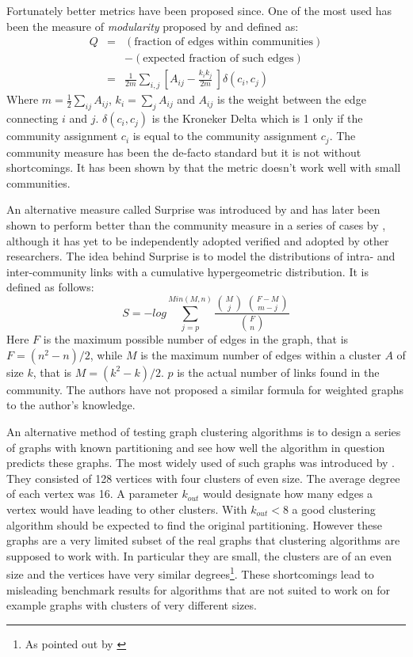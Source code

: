 Fortunately better metrics have been proposed since. One of the most 
used has been the measure of \emph{modularity} proposed by 
\cite{girvan2002} and defined as:
\begin{eqnarray}
	Q & = & (\mbox{fraction of edges within communities}) \\
	  & & - (\mbox{expected fraction of such edges}) \\
	& = & \frac{1}{2m} \sum_{i,j} \left[ A_{ij} - \frac{k_i k_j}{2m} \
\right] \delta(c_i, c_j)
\end{eqnarray}
Where $m=\frac{1}{2} \sum_{ij} A_{ij}$, $k_i = \sum_j A_{ij}$ and 
$A_{ij}$ is the weight between the edge connecting $i$ and $j$.  
$\delta(c_i, c_j)$ is the Kroneker Delta which is 1 only if the 
community assignment $c_i$ is equal to the community assignment $c_j$.  
The community measure has been the de-facto standard but it is not 
without shortcomings. It has been shown by \cite{brandes2007} that the 
metric doesn't work well with small communities.

An alternative measure called Surprise was introduced by 
\cite{arnau2005} and has later been shown to perform better than the 
community measure in a series of cases by \cite{aldecoa2011}, although 
it has yet to be independently adopted verified and adopted by other 
researchers. The idea behind Surprise is to model the distributions of 
intra- and inter-community links with a cumulative hypergeometric 
distribution. It is defined as follows:
\begin{equation}
	S = -log \sum_{j=p}^{Min(M,n)} \frac{\binom{M}{j} \
	\binom{F-M}{m-j}}{\binom{F}{n}}
\end{equation}
Here $F$ is the maximum possible number of edges in the graph, that is 
$F = (n^2-n)/2$, while $M$ is the maximum number of edges within a 
cluster $A$ of size $k$, that is $M = (k^2-k)/2$. $p$ is the actual 
number of links found in the community. The authors have not proposed a 
similar formula for weighted graphs to the author's knowledge.

An alternative method of testing graph clustering algorithms is to 
design a series of graphs with known partitioning and see how well the 
algorithm in question predicts these graphs. The most widely used of 
such graphs was introduced by \cite{girvan2002}. They consisted of 128 
vertices with four clusters of even size. The average degree of each 
vertex was 16. A parameter $k_{out}$ would designate how many edges a 
vertex would have leading to other clusters. With $k_{out} < 8$ a good 
clustering algorithm should be expected to find the original 
partitioning.  However these graphs are a very limited subset of the 
real graphs that clustering algorithms are supposed to work with. In 
particular they are small, the clusters are of an even size and the 
vertices have very similar degrees\footnote{As pointed out by 
\cite{lancichinetti2008}}.  These shortcomings lead to misleading 
benchmark results for algorithms that are not suited to work on for 
example graphs with clusters of very different sizes.

